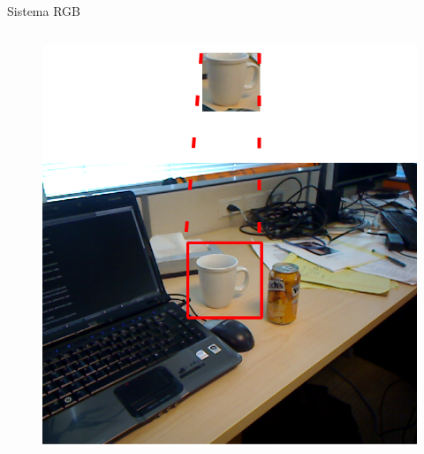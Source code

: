 \documentclass[]{beamer}
\begin{document}
\begin{frame}{Sistema RGB}
\begin{columns}
\begin{column}{5cm}
{                \begin{figure}[t]
                    \centering
                    \vspace{-15pt}
                    \includegraphics[width=\textwidth]{img/template_matching/template_matching_marcado.png}
                \end{figure}
            }
\end{column}
\end{columns}
\end{frame}
\end{document}
